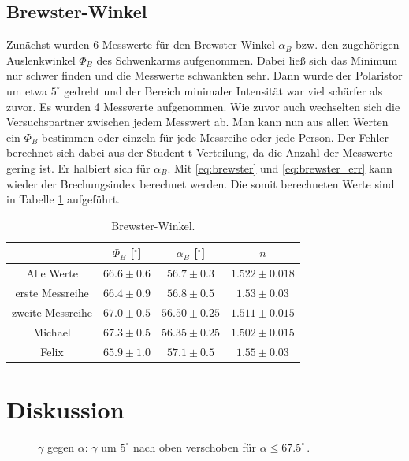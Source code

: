 \documentclass[12pt,a4paper,titlepage,headinclude,bibtotoc]{scrartcl}
\begin{document}
\subsection{Brewster-Winkel}
Zunächst wurden 6 Messwerte für den Brewster-Winkel $\alpha_B$ bzw. den zugehörigen Auslenkwinkel $\Phi_B$ des Schwenkarms aufgenommen.
Dabei ließ sich das Minimum nur schwer finden und die Messwerte schwankten sehr.
Dann wurde der Polaristor um etwa $5^\circ$ gedreht und der Bereich minimaler Intensität war viel schärfer als zuvor.
Es wurden 4 Messwerte aufgenommen.
Wie zuvor auch wechselten sich die Versuchspartner zwischen jedem Messwert ab.
Man kann nun aus allen Werten ein $\Phi_B$ bestimmen oder einzeln für jede Messreihe oder jede Person.
Der Fehler berechnet sich dabei aus der Student-t-Verteilung, da die Anzahl der Messwerte gering ist.
Er halbiert sich für $\alpha_B$.
Mit \eqref{eq:brewster} und \eqref{eq:brewster_err} kann wieder der Brechungsindex berechnet werden.
Die somit berechneten Werte sind in Tabelle \ref{tab:brewster} aufgeführt.
\begin{table}[!htb]
	\centering
	\begin{tabular}{|c|c|c|c|}
		\hline		
		& $\Phi_B$ [$^\circ$] & $\alpha_B$ [$^\circ$] & $n$ \\
		\hline
		Alle Werte & $66.6 \pm 0.6$ & $56.7 \pm 0.3$ & $1.522 \pm 0.018$ \\
		erste Messreihe & $66.4 \pm 0.9$ & $56.8 \pm 0.5$ & $1.53 \pm 0.03$ \\
		zweite Messreihe & $67.0 \pm 0.5$ & $56.50 \pm 0.25$ & $1.511 \pm 0.015$ \\
		\hline
		Michael & $67.3 \pm 0.5$ & $56.35 \pm 0.25$ & $1.502 \pm 0.015$ \\
		Felix & $65.9 \pm 1.0$ & $57.1 \pm 0.5$ & $1.55 \pm 0.03$ \\
		\hline
	\end{tabular}
	\caption{Brewster-Winkel.}
	\label{tab:brewster}
\end{table}

\section{Diskussion}
\label{sec:diskussion}

\begin{figure}[!htb]
	\centering
	
	\caption{$\gamma$ gegen $\alpha$: $\gamma$ um $5^\circ$ nach oben verschoben für $\alpha \leq 67.5^\circ\,$.}
\end{figure}




\end{document}
